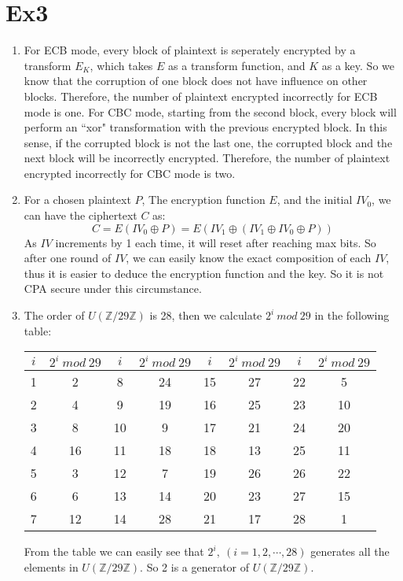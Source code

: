 \documentclass[12pt, a4paper]{article}
\begin{document}
\section*{Ex3}
\begin{enumerate}
    \item For ECB mode, every block of plaintext is seperately encrypted by a transform $E_K$, 
          which takes $E$ as a transform function, and $K$ as a key. 
          So we know that the corruption of one block does not have influence on other blocks. 
          Therefore, the number of plaintext encrypted incorrectly for ECB mode is one.\newline
          For CBC mode, starting from the second block, every block will perform an ``xor" transformation 
          with the previous encrypted block. In this sense, if the corrupted block is not the last one, 
          the corrupted block and the next block will be incorrectly encrypted. Therefore, 
          the number of plaintext encrypted incorrectly for CBC mode is two.
    \item For a chosen plaintext $P$, The encryption function $E$, and the initial $IV_0$, 
          we can have the ciphertext $C$ as:
          $$C = E(IV_0 \oplus P) = E(IV_1 \oplus (IV_1 \oplus IV_0 \oplus P))$$
          As $IV$ increments by 1 each time, it will reset after reaching max bits. 
          So after one round of $IV$, we can easily know the exact composition of each $IV$, 
          thus it is easier to deduce the encryption function and the key.\newline
          So it is not CPA secure under this circumstance.
    \item The order of $U(\mathbb{Z}/29\mathbb{Z})$ is 28, then we calculate $2^i\ mod\ 29$ in the following table:
          \begin{center}
              \begin{tabular}{cccccccc}
                \hline
                $i$ & $2^i\ mod\ 29$ & $i$ & $2^i\ mod\ 29$ & $i$ & $2^i\ mod\ 29$ & $i$ & $2^i\ mod\ 29$\\
                \hline
                1 & 2 & 8 & 24 & 15 & 27 & 22 & 5\\
                2 & 4 & 9 & 19 & 16 & 25 & 23 & 10\\
                3 & 8 & 10 & 9 & 17 & 21 & 24 & 20\\
                4 & 16 & 11 & 18 & 18 & 13 & 25 & 11\\
                5 & 3 & 12 & 7 & 19 & 26 & 26 & 22\\
                6 & 6 & 13 & 14 & 20 & 23 & 27 & 15\\
                7 & 12 & 14 & 28 & 21 & 17 & 28 & 1\\
                \hline
              \end{tabular}
          \end{center}
          From the table we can easily see that $2^i,\ (i = 1, 2, \cdots, 28)$ generates all the elements 
          in $U(\mathbb{Z}/29\mathbb{Z})$. So 2 is a generator of $U(\mathbb{Z}/29\mathbb{Z})$.
          \vspace{0.3cm}
          

\end{enumerate}
\end{document}
